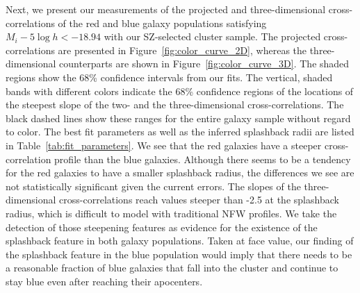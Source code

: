 \documentclass[iop, apjl, twocolappendix, numberedappendix]{emulateapj}
\begin{document}
Next, we present our measurements of the projected and
three-dimensional cross-correlations of the red and blue galaxy populations
satisfying $M_{i}-5\log h<-18.94$ with our SZ-selected cluster
sample. The projected cross-correlations are presented in Figure~\ref{fig:color_curve_2D},
whereas the three-dimensional counterparts are shown in 
Figure~\ref{fig:color_curve_3D}. The shaded regions show
the 68\% confidence intervals from our fits. The vertical, shaded
bands with different colors indicate the 68\% confidence regions of
the locations of the steepest slope of the two- and the
three-dimensional cross-correlations. The black dashed lines show
these ranges for the entire galaxy sample without regard to color.
The best fit parameters as well as the inferred splashback radii are
listed in Table~\ref{tab:fit_parameters}. We
see that the red galaxies have a steeper cross-correlation profile
than the blue galaxies. Although there seems to be  a tendency for the red
galaxies to have a smaller splashback radius, the differences we see
are not statistically significant given the current errors. The
slopes of the three-dimensional cross-correlations reach values
steeper than -2.5 at the splashback radius, which is difficult to model with
traditional NFW profiles. We take the detection of those steepening features 
as evidence for the existence of the splashback feature in both galaxy populations.
Taken at face value, our finding of the splashback feature in the blue
population would imply that there needs to be a reasonable fraction of
blue galaxies that fall into the cluster and continue to stay blue
even after reaching their apocenters.


\end{document}
